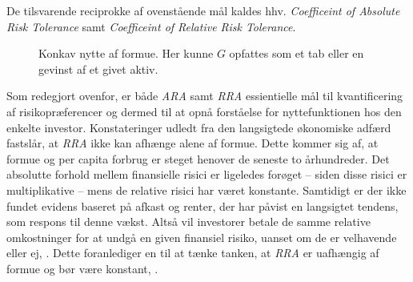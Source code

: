 \documentclass[
  a4paper,
  oneside]{memoir}
\begin{document}
De tilsvarende reciprokke af ovenstående mål kaldes hhv. \emph{Coefficeint of Absolute Risk Tolerance} samt \emph{Coefficeint of Relative Risk Tolerance}.

\begin{figure}[H]
\centering
{}
\caption[Konkav nytte af formue.]{Konkav nytte af formue. Her kunne $G$ opfattes som et tab eller en gevinst af et givet aktiv.}
\label{fig:Nyt}
\end{figure}

Som redegjort ovenfor, er både \emph{ARA} samt \emph{RRA} essientielle mål til kvantificering af risikopræferencer og dermed til at opnå forståelse for nyttefunktionen hos den enkelte investor. Konstateringer udledt fra den langsigtede økonomiske adfærd fastslår, at \emph{RRA} ikke kan afhænge alene af formue. Dette kommer sig af, at formue og per capita forbrug er steget henover de seneste to århundreder. Det absolutte forhold mellem finansielle risici er ligeledes forøget -- siden disse risici er multiplikative -- mens de relative risici har været konstante. Samtidigt er der ikke fundet evidens baseret på afkast og renter, der har påvist en langsigtet tendens, som respons til denne vækst. Altså vil investorer betale de samme relative omkostninger for at undgå en given finansiel risiko, uanset om de er velhavende eller ej, \citep{CampVic2003}. Dette foranlediger en til at tænke tanken, at \emph{RRA} er uafhængig af formue og bør være konstant, \citep{Chiappori2008}.
\end{document}
